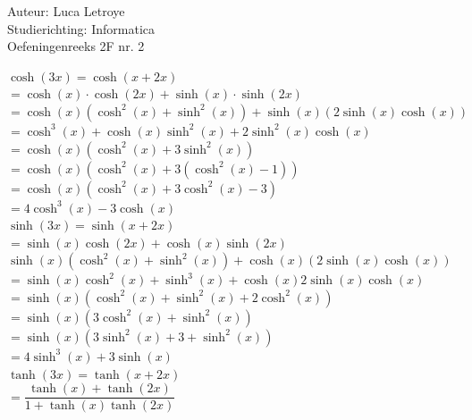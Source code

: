 \documentclass[a4paper]{article}
\begin{document}
  
\noindent \large Auteur: Luca Letroye        \\
\noindent \large Studierichting: Informatica \\
\noindent \large Oefeningenreeks 2F nr. 2 \\

\medskip

\normalsize

$\cosh(3x) = \cosh(x +2x)$\\

$= \cosh (x) \cdot \cosh(2x) + \sinh(x) \cdot \sinh(2x) $\\

$= \cosh(x) (\cosh^2(x) +\sinh^2 (x)) + \sinh(x)(2\sinh(x)\cosh(x)) $\\

$= \cosh^3(x) + \cosh(x)\sinh^2(x) + 2\sinh^2(x)\cosh(x)$\\

$= \cosh(x)(\cosh^2(x) +3\sinh^2(x))$\\

$= \cosh(x)(\cosh^2(x) + 3(\cosh^2(x)-1))$\\

$= \cosh(x)(\cosh^2(x) + 3\cosh^2(x) -3)$\\

$= 4\cosh^3(x) - 3\cosh(x) $\\

$\sinh(3x) = \sinh(x+2x)$\\

$= \sinh(x) \cosh(2x) + \cosh(x)\sinh(2x)$\\

$\sinh(x)(\cosh^2(x) + \sinh^2(x)) + \cosh(x)(2\sinh(x)\cosh(x)) $\\

$= \sinh(x)\cosh^2(x) +\sinh^3(x) +\cosh(x)2\sinh(x)\cosh(x)$\\

$= \sinh(x)(\cosh^2(x) +\sinh^2(x) +2\cosh^2(x))$\\

$= \sinh(x)(3\cosh^2(x) + \sinh^2(x))$\\

$= \sinh(x)(3\sinh^2(x)+3+\sinh^2(x))$\\

$= 4\sinh^3(x) +3\sinh(x)$\\

$\tanh(3x) = \tanh(x+2x)$\\

$= \dfrac{\tanh(x)+\tanh(2x)}{1+\tanh(x) \tanh(2x)}$\\
\end{document}
